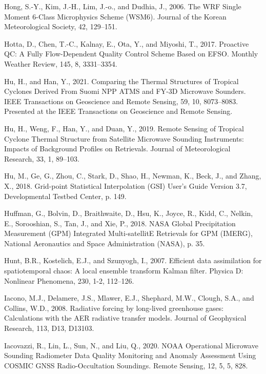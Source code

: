 \documentclass[12pt,oneside,a4paper]{reedthesis}
\begin{document}
\leavevmode\hypertarget{ref-hong2006a}{}%
Hong, S.-Y., Kim, J.-H., Lim, J.-o., and Dudhia, J., 2006. The WRF Single Moment 6-Class Microphysics Scheme (WSM6). Journal of the Korean Meteorological Society, 42, 129--151.

\leavevmode\hypertarget{ref-hotta2017}{}%
Hotta, D., Chen, T.-C., Kalnay, E., Ota, Y., and Miyoshi, T., 2017. Proactive QC: A Fully Flow-Dependent Quality Control Scheme Based on EFSO. Monthly Weather Review, 145, 8, 3331--3354.

\leavevmode\hypertarget{ref-hu2021}{}%
Hu, H., and Han, Y., 2021. Comparing the Thermal Structures of Tropical Cyclones Derived From Suomi NPP ATMS and FY-3D Microwave Sounders. IEEE Transactions on Geoscience and Remote Sensing, 59, 10, 8073--8083. Presented at the IEEE Transactions on Geoscience and Remote Sensing.

\leavevmode\hypertarget{ref-hu2019}{}%
Hu, H., Weng, F., Han, Y., and Duan, Y., 2019. Remote Sensing of Tropical Cyclone Thermal Structure from Satellite Microwave Sounding Instruments: Impacts of Background Profiles on Retrievals. Journal of Meteorological Research, 33, 1, 89--103.

\leavevmode\hypertarget{ref-hu2018}{}%
Hu, M., Ge, G., Zhou, C., Stark, D., Shao, H., Newman, K., Beck, J., and Zhang, X., 2018. Grid-point Statistical Interpolation (GSI) User's Guide Version 3.7, Developmental Testbed Center, p. 149.

\leavevmode\hypertarget{ref-huffman2018}{}%
Huffman, G., Bolvin, D., Braithwaite, D., Hsu, K., Joyce, R., Kidd, C., Nelkin, E., Sorooshian, S., Tan, J., and Xie, P., 2018. NASA Global Precipitation Measurement (GPM) Integrated Multi-satellitE Retrievals for GPM (IMERG), National Aeronautics and Space Administration (NASA), p. 35.

\leavevmode\hypertarget{ref-hunt2007}{}%
Hunt, B.R., Kostelich, E.J., and Szunyogh, I., 2007. Efficient data assimilation for spatiotemporal chaos: A local ensemble transform Kalman filter. Physica D: Nonlinear Phenomena, 230, 1-2, 112--126.

\leavevmode\hypertarget{ref-iacono2008}{}%
Iacono, M.J., Delamere, J.S., Mlawer, E.J., Shephard, M.W., Clough, S.A., and Collins, W.D., 2008. Radiative forcing by long-lived greenhouse gases: Calculations with the AER radiative transfer models. Journal of Geophysical Research, 113, D13, D13103.

\leavevmode\hypertarget{ref-iacovazzi2020}{}%
Iacovazzi, R., Lin, L., Sun, N., and Liu, Q., 2020. NOAA Operational Microwave Sounding Radiometer Data Quality Monitoring and Anomaly Assessment Using COSMIC GNSS Radio-Occultation Soundings. Remote Sensing, 12, 5, 5, 828.
\end{document}
